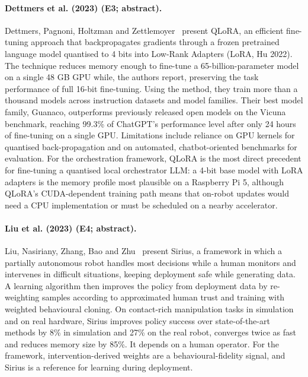 \documentclass[10pt,a4paper]{article}
\begin{document}
\paragraph{Dettmers et al. (2023) (E3; abstract).} Dettmers, Pagnoni, Holtzman and Zettlemoyer~\cite{Dettmers2023} present QLoRA, an efficient fine-tuning approach that backpropagates gradients through a frozen pretrained language model quantised to 4 bits into Low-Rank Adapters (LoRA, Hu 2022). The technique reduces memory enough to fine-tune a 65-billion-parameter model on a single 48 GB GPU while, the authors report, preserving the task performance of full 16-bit fine-tuning. Using the method, they train more than a thousand models across instruction datasets and model families. Their best model family, Guanaco, outperforms previously released open models on the Vicuna benchmark, reaching 99.3\% of ChatGPT's performance level after only 24 hours of fine-tuning on a single GPU. Limitations include reliance on GPU kernels for quantised back-propagation and on automated, chatbot-oriented benchmarks for evaluation. For the orchestration framework, QLoRA is the most direct precedent for fine-tuning a quantised local orchestrator LLM: a 4-bit base model with LoRA adapters is the memory profile most plausible on a Raspberry Pi 5, although QLoRA's CUDA-dependent training path means that on-robot updates would need a CPU implementation or must be scheduled on a nearby accelerator.

\paragraph{Liu et al. (2023) (E4; abstract).} Liu, Nasiriany, Zhang, Bao and Zhu~\cite{Liu2023} present Sirius, a framework in which a partially autonomous robot handles most decisions while a human monitors and intervenes in difficult situations, keeping deployment safe while generating data. A learning algorithm then improves the policy from deployment data by re-weighting samples according to approximated human trust and training with weighted behavioural cloning. On contact-rich manipulation tasks in simulation and on real hardware, Sirius improves policy success over state-of-the-art methods by 8\% in simulation and 27\% on the real robot, converges twice as fast and reduces memory size by 85\%. It depends on a human operator. For the framework, intervention-derived weights are a behavioural-fidelity signal, and Sirius is a reference for learning during deployment.
\end{document}
